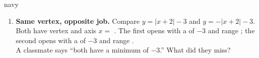 \documentclass[10pt]{article}
\begin{document}
\begin{scenariobox}{navy}
\begin{enumerate}[leftmargin=1.9em, itemsep=9pt]
  \item \textbf{Same vertex, opposite job.} Compare $y=|x+2|-3$ and $y=-|x+2|-3$. \\[2pt]
    Both have vertex \blank{1.4cm} and axis $x=$ \blank{0.9cm}. The first opens \blank{1.0cm}
    with a \blank{1.4cm} of $-3$ and range \blank{1.5cm}; the second opens \blank{1.0cm} with a
    \blank{1.4cm} of $-3$ and range \blank{1.5cm}. \\[2pt]
    A classmate says ``both have a minimum of $-3$.'' What did they miss?
    \par{}
\end{enumerate}
\end{scenariobox}
\end{document}

